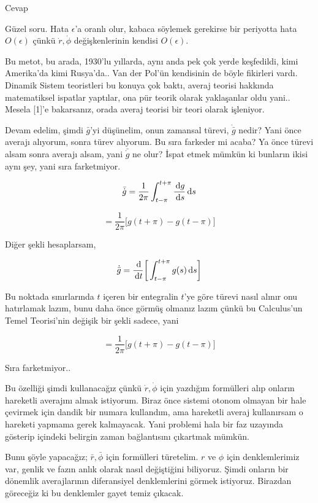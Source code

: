 \documentclass[12pt,fleqn]{article}\usepackage{../../common}
\begin{document}
Cevap

Güzel soru. Hata $\epsilon$'a oranlı olur, kabaca söylemek gerekirse bir
periyotta hata $O(\epsilon)$ çünkü $\dot{r},\dot{\phi}$ değişkenlerinin kendisi
$O(\epsilon)$. 

Bu metot, bu arada, 1930'lu yıllarda, aynı anda pek çok yerde keşfedildi,
kimi Amerika'da kimi Rusya'da.. Van der Pol'ün kendisinin de böyle fikirleri
vardı. Dinamik Sistem teoristleri bu konuya çok baktı, averaj teorisi hakkında
matematiksel ispatlar yaptılar, ona pür teorik olarak yaklaşanlar oldu
yani.. Mesela [1]'e bakarsanız, orada averaj teorisi bir teori olarak
işleniyor. 

Devam edelim, şimdi $\bar{g}$'yi düşünelim, onun zamansal türevi,
$\dot{\bar{g}}$ nedir? Yani önce averajı alıyorum, sonra türev alıyorum. Bu sıra
farkeder mi acaba? Ya önce türevi alsam sonra averajı alsam, yani
$\bar{\dot{g}}$ ne olur? İspat etmek mümkün ki bunların ikisi aynı şey, yani
sıra farketmiyor. 

$$ \bar{\dot{g}} =
\frac{1}{2\pi} \int _{t-\pi}^{t+\pi} \frac{\,\mathrm{d} g}{\,\mathrm{d} s} \,\mathrm{d} s
$$


$$
= \frac{1}{2\pi} \bigg[ g(t+\pi) -   g(t-\pi) \bigg]
$$

Diğer şekli hesaplarsam,

$$ \dot{\bar{g}} =
\frac{\,\mathrm{d}}{\,\mathrm{d} t} \bigg[ \int _{t-\pi}^{t+\pi} g(s) \,\mathrm{d} s \bigg]
$$

Bu noktada sınırlarında $t$ içeren bir entegralin $t$'ye göre türevi nasıl
alınır onu hatırlamak lazım, bunu daha önce görmüş olmanız lazım çünkü bu
Calculus'un Temel Teorisi'nin değişik bir şekli sadece, yani

$$
= \frac{1}{2\pi} \bigg[ g(t+\pi) -   g(t-\pi) \bigg]
$$

Sıra farketmiyor..

Bu özelliği şimdi kullanacağız çünkü $\dot{r},\dot{\phi}$ için yazdığım
formülleri alıp onların hareketli averajını almak istiyorum. Biraz önce sistemi
otonom olmayan bir hale çevirmek için dandik bir numara kullandım, ama hareketli
averaj kullanırsam o hareketi yapmama gerek kalmayacak. Yani problemi hala bir
faz uzayında gösterip içindeki belirgin zaman bağlantısını çıkartmak
mümkün.

Bunu şöyle yapacağız; $\bar{r},\bar{\phi}$ için formülleri türetelim. $r$ ve
$\phi$ için denklemlerimiz var, genlik ve fazın anlık olarak nasıl değiştiğini
biliyoruz. Şimdi onların bir dönemlik averajlarının diferansiyel denklemlerini
görmek istiyoruz. Birazdan göreceğiz ki bu denklemler gayet temiz çıkacak.
\end{document}
